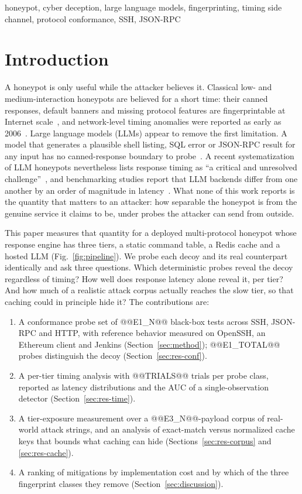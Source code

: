 \documentclass[conference]{IEEEtran}
\begin{document}
\begin{IEEEkeywords}
honeypot, cyber deception, large language models, fingerprinting, timing side channel, protocol conformance, SSH, JSON-RPC
\end{IEEEkeywords}

\section{Introduction}
A honeypot is only useful while the attacker believes it. Classical low- and medium-interaction honeypots are believed for a short time: their canned responses, default banners and missing protocol features are fingerprintable at Internet scale~\cite{ref3,ref4}, and network-level timing anomalies were reported as early as 2006~\cite{ref2}. Large language models (LLMs) appear to remove the first limitation. A model that generates a plausible shell listing, SQL error or JSON-RPC result for any input has no canned-response boundary to probe~\cite{ref5,ref6,ref7,ref8}. A recent systematization of LLM honeypots nevertheless lists response timing as ``a critical and unresolved challenge''~\cite{ref9}, and benchmarking studies report that LLM backends differ from one another by an order of magnitude in latency~\cite{ref10,ref11}. What none of this work reports is the quantity that matters to an attacker: how separable the honeypot is from the genuine service it claims to be, under probes the attacker can send from outside.

This paper measures that quantity for a deployed multi-protocol honeypot whose response engine has three tiers, a static command table, a Redis cache and a hosted LLM (Fig.~\ref{fig:pipeline}). We probe each decoy and its real counterpart identically and ask three questions. Which deterministic probes reveal the decoy regardless of timing? How well does response latency alone reveal it, per tier? And how much of a realistic attack corpus actually reaches the slow tier, so that caching could in principle hide it? The contributions are:
\begin{enumerate}
\item A conformance probe set of @@E1_N@@ black-box tests across SSH, JSON-RPC and HTTP, with reference behavior measured on OpenSSH, an Ethereum client and Jenkins (Section~\ref{sec:method}); @@E1_TOTAL@@ probes distinguish the decoy (Section~\ref{sec:res-conf}).
\item A per-tier timing analysis with @@TRIALS@@ trials per probe class, reported as latency distributions and the AUC of a single-observation detector (Section~\ref{sec:res-time}).
\item A tier-exposure measurement over a @@E3_N@@-payload corpus of real-world attack strings, and an analysis of exact-match versus normalized cache keys that bounds what caching can hide (Sections~\ref{sec:res-corpus} and \ref{sec:res-cache}).
\item A ranking of mitigations by implementation cost and by which of the three fingerprint classes they remove (Section~\ref{sec:discussion}).
\end{enumerate}
\end{document}
